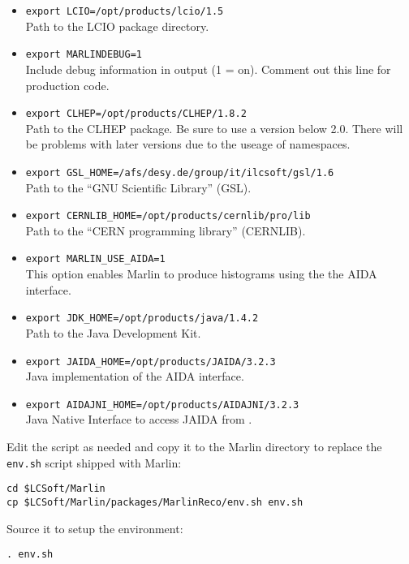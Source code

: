 \begin{itemize}
\item {\tt export LCIO=/opt/products/lcio/1.5} \\
      Path to the LCIO package directory.
\item {\tt export MARLINDEBUG=1} \\
      Include debug information in output (1 = on).
      Comment out this line for production code.
\item {\tt export CLHEP=/opt/products/CLHEP/1.8.2} \\
      Path to the CLHEP package. Be sure to use a version below 2.0.
      There will be problems with later versions due to the useage of
      namespaces.
\item {\tt export GSL\_HOME=/afs/desy.de/group/it/ilcsoft/gsl/1.6} \\
      Path to the ``GNU Scientific Library'' (GSL).
\item {\tt export CERNLIB\_HOME=/opt/products/cernlib/pro/lib} \\
      Path to the ``CERN programming library'' (CERNLIB).
\item {\tt export MARLIN\_USE\_AIDA=1} \\
      This option enables Marlin to produce histograms using the
      the AIDA~\cite{ref_aida} interface.
\item {\tt export JDK\_HOME=/opt/products/java/1.4.2} \\
      Path to the Java Development Kit.
\item {\tt export JAIDA\_HOME=/opt/products/JAIDA/3.2.3} \\
      Java implementation of the AIDA interface.
\item {\tt export AIDAJNI\_HOME=/opt/products/AIDAJNI/3.2.3} \\
      Java Native Interface to access JAIDA from \CPP{}.
\end{itemize}

Edit the script as needed and copy it to the Marlin directory to
replace the {\tt env.sh} script shipped with Marlin:

\begin{verbatim}
cd $LCSoft/Marlin
cp $LCSoft/Marlin/packages/MarlinReco/env.sh env.sh
\end{verbatim}

Source it to setup the environment:

\begin{verbatim}
. env.sh
\end{verbatim}

